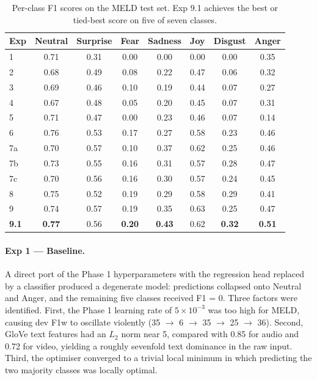 \documentclass[11pt,twocolumn]{article}
\begin{document}
\begin{table}[t]
\centering
\small
\begin{tabular}{lccccccc}
\toprule
\textbf{Exp} & Neutral & Surprise & Fear & Sadness & Joy & Disgust & Anger \\
\midrule
1    & 0.71 & 0.31 & 0.00 & 0.00 & 0.00 & 0.00 & 0.35 \\
2    & 0.68 & 0.49 & 0.08 & 0.22 & 0.47 & 0.06 & 0.32 \\
3    & 0.69 & 0.46 & 0.10 & 0.19 & 0.44 & 0.07 & 0.27 \\
4    & 0.67 & 0.48 & 0.05 & 0.20 & 0.45 & 0.07 & 0.31 \\
5    & 0.71 & 0.47 & 0.00 & 0.23 & 0.46 & 0.07 & 0.14 \\
6    & 0.76 & 0.53 & 0.17 & 0.27 & 0.58 & 0.23 & 0.46 \\
7a   & 0.70 & 0.57 & 0.10 & 0.37 & 0.62 & 0.25 & 0.46 \\
7b   & 0.73 & 0.55 & 0.16 & 0.31 & 0.57 & 0.28 & 0.47 \\
7c   & 0.70 & 0.56 & 0.16 & 0.30 & 0.57 & 0.24 & 0.45 \\
8    & 0.75 & 0.52 & 0.19 & 0.29 & 0.58 & 0.29 & 0.41 \\
9    & 0.74 & 0.57 & 0.19 & 0.35 & 0.63 & 0.25 & 0.47 \\
\textbf{9.1} & \textbf{0.77} & 0.56 & \textbf{0.20} & \textbf{0.43} & 0.62 & \textbf{0.32} & \textbf{0.51} \\
\bottomrule
\end{tabular}
\caption{Per-class F1 scores on the MELD test set. Exp 9.1 achieves the best or tied-best score on five of seven classes.}
\label{tab:meld_perclass}
\end{table}

\paragraph{Exp 1 --- Baseline.} A direct port of the Phase 1 hyperparameters with the regression head replaced by a classifier produced a degenerate model: predictions collapsed onto Neutral and Anger, and the remaining five classes received F1 = 0. Three factors were identified. First, the Phase 1 learning rate of $5 \times 10^{-3}$ was too high for MELD, causing dev F1w to oscillate violently (35 $\to$ 6 $\to$ 35 $\to$ 25 $\to$ 36). Second, GloVe text features had an $L_2$ norm near 5, compared with 0.85 for audio and 0.72 for video, yielding a roughly sevenfold text dominance in the raw input. Third, the optimiser converged to a trivial local minimum in which predicting the two majority classes was locally optimal.
\end{document}
